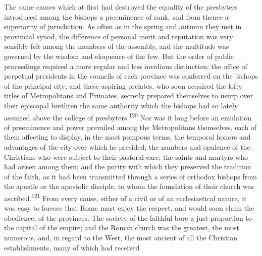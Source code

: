 

The same causes which at first had destroyed the equality of the
presbyters introduced among the bishops a preeminence of rank,
and from thence a superiority of jurisdiction. As often as in the
spring and autumn they met in provincial synod, the difference of
personal merit and reputation was very sensibly felt among the
members of the assembly, and the multitude was governed by the
wisdom and eloquence of the few. But the order of public
proceedings required a more regular and less invidious
distinction; the office of perpetual presidents in the councils
of each province was conferred on the bishops of the principal
city; and these aspiring prelates, who soon acquired the lofty
titles of Metropolitans and Primates, secretly prepared
themselves to usurp over their episcopal brethren the same
authority which the bishops had so lately assumed above the
college of presbyters.\textsuperscript{120} Nor was it long before an emulation of
preeminence and power prevailed among the Metropolitans
themselves, each of them affecting to display, in the most
pompous terms, the temporal honors and advantages of the city
over which he presided; the numbers and opulence of the
Christians who were subject to their pastoral care; the saints
and martyrs who had arisen among them; and the purity with which
they preserved the tradition of the faith, as it had been
transmitted through a series of orthodox bishops from the apostle
or the apostolic disciple, to whom the foundation of their church
was ascribed.\textsuperscript{121} From every cause, either of a civil or of an
ecclesiastical nature, it was easy to foresee that Rome must
enjoy the respect, and would soon claim the obedience, of the
provinces. The society of the faithful bore a just proportion to
the capital of the empire; and the Roman church was the greatest,
the most numerous, and, in regard to the West, the most ancient
of all the Christian establishments, many of which had received
